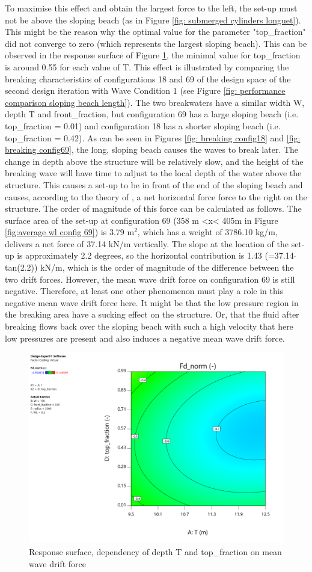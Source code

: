 To maximise this effect and obtain the largest force to the left, the set-up must not be above the sloping beach (as in Figure \ref{fig: submerged cylinders longuet}). This might be the reason why the optimal value for the parameter "top\_fraction" did not converge to zero (which represents the largest sloping beach). This can be observed in the response surface of Figure \ref{fig: response surface top fraction}, the minimal value for top\_fraction is around 0.55 for each value of T. This effect is illustrated by comparing the breaking characteristics of configurations 18 and 69 of the design space of the second design iteration with Wave Condition 1 (see Figure \ref{fig: performance comparison sloping beach length}). The two breakwaters have a similar width W, depth T and front\_fraction, but configuration 69 has a large sloping beach (i.e. top\_fraction = 0.01) and configuration 18 has a shorter sloping beach (i.e. top\_fraction = 0.42). As can be seen in Figures \ref{fig: breaking config18} and \ref{fig: breaking config69}, the long, sloping beach causes the waves to break later. The change in depth above the structure will be relatively slow, and the height of the breaking wave will have time to adjust to the local depth of the water above the structure. This causes a set-up to be in front of the end of the sloping beach and causes, according to the theory of \citet{longuethiggins1977}, a net horizontal force force to the right on the structure. The order of magnitude of this force can be calculated as follows. The surface area of the set-up at configuration 69 (358 m <x< 405m in Figure \ref{fig:average wl config 69}) is 3.79 m$^2$, which has a weight of 3786.10 kg/m, delivers a net force of 37.14 kN/m vertically. The slope at the location of the set-up is approximately 2.2 degrees, so the horizontal contribution is  1.43 (=37.14$\cdot$tan(2.2)) kN/m, which is the order of magnitude of the difference between the two drift forces. However, the mean wave drift force on configuration 69 is still negative. Therefore, at least one other phenomenon must play a role in this negative mean wave drift force here. It might be that the low pressure region in the breaking area have a sucking effect on the structure. Or, that the fluid after breaking flows back over the sloping beach with such a high velocity that here low pressures are present and also induces a negative mean wave drift force. 

\begin{figure}[h]
    \centering
    \includegraphics[width=0.49\linewidth]{figures/ComFLOW/Results DI2/Fd_front_fraction_T.png}
    \caption{Response surface, dependency of depth T and top\_fraction on mean wave drift force}
    \label{fig: response surface top fraction}
\end{figure}

